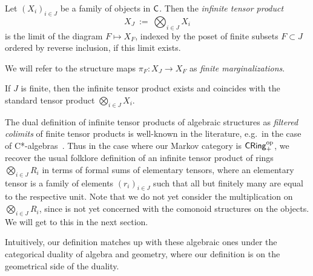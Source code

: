 \documentclass[11pt]{article}
\begin{document}
\begin{definition}
	\label{semicartesian_infproduct}
	Let $(X_i)_{i \in J}$ be a family of objects in $\mathsf{C}$. Then the \emph{infinite tensor product}
	\[
		X_J \: := \: \bigotimes_{i \in J} X_i
	\]
	is the limit of the diagram $F \mapsto X_F$, indexed by the poset of finite subsets $F \subset J$ ordered by reverse inclusion, if this limit exists.
\end{definition}

We will refer to the structure maps $\pi_F : X_J \to X_F$ as \emph{finite marginalizations}. %

\begin{remark}
	If $J$ is finite, then the infinite tensor product exists and coincides with the standard tensor product $\bigotimes_{i \in J} X_i$.
\end{remark}

\begin{remark}
	The dual definition of infinite tensor products of algebraic structures as \emph{filtered colimits} of finite tensor products is well-known in the literature, e.g.~in the case of C*-algebras~\cite[p.~315]{blackadar}. Thus in the case where our Markov category is $\operatorname{\mathsf{CRing}}_+^{\mathrm{op}}$, we recover the usual folklore definition of an infinite tensor product of rings $\bigotimes_{i \in J} R_i$ in terms of formal sums of elementary tensors, where an elementary tensor is a family of elements $(r_i)_{i \in J}$ such that all but finitely many are equal to the respective unit. Note that we do not yet consider the multiplication on $\bigotimes_{i \in J} R_i$, since  is not yet concerned with the comonoid structures on the objects. We will get to this in the next section.
	
	Intuitively, our definition matches up with these algebraic ones under the categorical duality of algebra and geometry, where our definition is on the geometrical side of the duality.
\end{remark}
\end{document}
